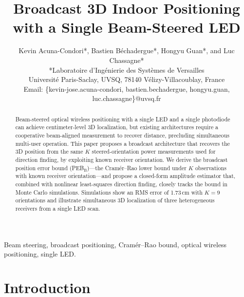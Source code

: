 \documentclass[conference]{IEEEtran}
\begin{document}
\title{Broadcast 3D Indoor Positioning with a Single Beam-Steered LED}
\author{
Kevin Acuna-Condori*, Bastien B\'{e}chadergue*, Hongyu Guan*, and Luc Chassagne*\\
*Laboratoire d'Ing\'{e}nierie des Syst\`{e}mes de Versailles\\
Universit\'{e} Paris-Saclay, UVSQ, 78140 V\'{e}lizy-Villacoublay, France\\
Email: \{kevin-jose.acuna-condori, bastien.bechadergue, hongyu.guan, luc.chassagne\}@uvsq.fr
}
\maketitle

\begin{abstract}
Beam-steered optical wireless positioning with a single LED and a single photodiode can achieve centimeter-level 3D localization, but existing architectures require a cooperative beam-aligned measurement to recover distance, precluding simultaneous multi-user operation.
This paper proposes a broadcast architecture that recovers the 3D position from the same $K$ steered-orientation power measurements used for direction finding, by exploiting known receiver orientation.
We derive the broadcast position error bound (PEB$_\mathrm{B}$)---the Cram\'{e}r--Rao lower bound under $K$ observations with known receiver orientation---and propose a closed-form amplitude estimator that, combined with nonlinear least-squares direction finding, closely tracks the bound in Monte Carlo simulations.
Simulations show an RMS error of 1.73\,cm with $K{=}9$ orientations and illustrate simultaneous 3D localization of three heterogeneous receivers from a single LED scan.
\end{abstract}

\begin{IEEEkeywords}
Beam steering, broadcast positioning, Cram\'{e}r--Rao bound, optical wireless positioning, single LED.
\end{IEEEkeywords}

\section{Introduction}
\label{sec:intro}
\end{document}
